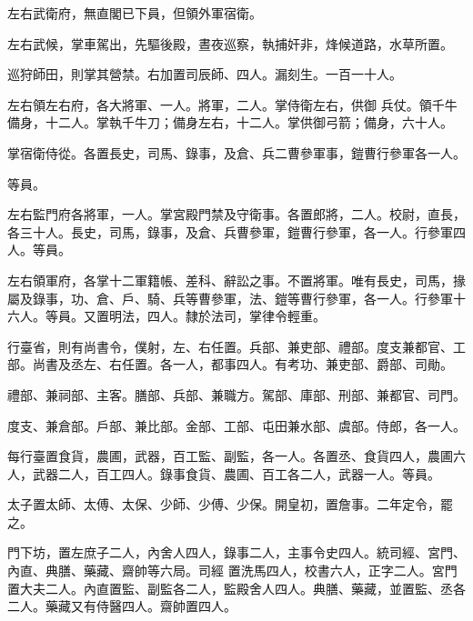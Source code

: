 \begin{pinyinscope}
 左右武衛府，無直閣已下員，但領外軍宿衛。



 左右武候，掌車駕出，先驅後殿，晝夜巡察，執捕奸非，烽候道路，水草所置。



 巡狩師田，則掌其營禁。右加置司辰師、四人。漏刻生。一百一十人。



 左右領左右府，各大將軍、一人。將軍，二人。掌侍衛左右，供御
 兵仗。領千牛備身，十二人。掌執千牛刀；備身左右，十二人。掌供御弓箭；備身，六十人。



 掌宿衛侍從。各置長史，司馬、錄事，及倉、兵二曹參軍事，鎧曹行參軍各一人。



 等員。



 左右監門府各將軍，一人。掌宮殿門禁及守衛事。各置郎將，二人。校尉，直長，各三十人。長史，司馬，錄事，及倉、兵曹參軍，鎧曹行參軍，各一人。行參軍四人。等員。



 左右領軍府，各掌十二軍籍帳、差科、辭訟之事。不置將軍。唯有長史，司馬，掾屬及錄事，功、倉、戶、騎、兵等曹參軍，法、鎧等曹行參軍，各一人。行參軍十六人。等員。又置明法，四人。隸於法司，掌律令輕重。



 行臺省，則有尚書令，僕射，左、右任置。兵部、兼吏部、禮部。度支兼都官、工部。尚書及丞左、右任置。各一人，都事四人。有考功、兼吏部、爵部、司勛。



 禮部、兼祠部、主客。膳部、兵部、兼職方。駕部、庫部、刑部、兼都官、司門。



 度支、兼倉部。戶部、兼比部。金部、工部、屯田兼水部、虞部。侍郎，各一人。



 每行臺置食貨，農圃，武器，百工監、副監，各一人。各置丞、食貨四人，農圃六人，武器二人，百工四人。錄事食貨、農圃、百工各二人，武器一人。等員。



 太子置太師、太傅、太保、少師、少傅、少保。開皇初，置詹事。二年定令，罷之。



 門下坊，置左庶子二人，內舍人四人，錄事二人，主事令史四人。統司經、宮門、內直、典膳、藥藏、齋帥等六局。司經
 置洗馬四人，校書六人，正字二人。宮門置大夫二人。內直置監、副監各二人，監殿舍人四人。典膳、藥藏，並置監、丞各二人。藥藏又有侍醫四人。齋帥置四人。




\end{pinyinscope}
